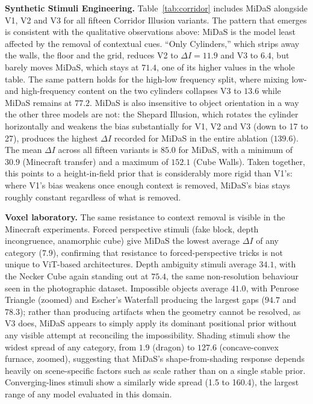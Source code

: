 \documentclass[10pt,twocolumn]{article}
\begin{document}
\textbf{Synthetic Stimuli Engineering.} Table~\ref{tab:corridor} includes MiDaS
alongside V1, V2 and V3 for all fifteen Corridor Illusion variants. The pattern
that emerges is consistent with the qualitative observations above: MiDaS is the
model least affected by the removal of contextual cues. ``Only Cylinders,'' which
strips away the walls, the floor and the grid, reduces V2 to $\Delta I = 11.9$ and
V3 to $6.4$, but barely moves MiDaS, which stays at $71.4$, one of its higher
values in the whole table. The same pattern holds for the high-low frequency
split, where mixing low- and high-frequency content on the two cylinders collapses
V3 to $13.6$ while MiDaS remains at $77.2$. MiDaS is also insensitive to object
orientation in a way the other three models are not: the Shepard Illusion, which
rotates the cylinder horizontally and weakens the bias substantially for V1, V2 and
V3 (down to 17 to 27), produces the highest $\Delta I$ recorded for MiDaS in the
entire ablation ($139.6$). The mean $\Delta I$ across all fifteen variants is
$85.0$ for MiDaS, with a minimum of $30.9$ (Minecraft transfer) and a maximum of
$152.1$ (Cube Walls). Taken together, this points to a height-in-field prior that
is considerably more rigid than V1's: where V1's bias weakens once enough context
is removed, MiDaS's bias stays roughly constant regardless of what is removed.

\textbf{Voxel laboratory.} The same resistance to context removal is visible in
the Minecraft experiments. Forced perspective stimuli (fake block, depth
incongruence, anamorphic cube) give MiDaS the lowest average $\Delta I$ of any
category ($7.9$), confirming that resistance to forced-perspective tricks is not
unique to ViT-based architectures. Depth ambiguity stimuli average $34.1$, with
the Necker Cube again standing out at $75.4$, the same non-resolution behaviour
seen in the photographic dataset. Impossible objects average $41.0$, with Penrose
Triangle (zoomed) and Escher's Waterfall producing the largest gaps ($94.7$ and
$78.3$); rather than producing artifacts when the geometry cannot be resolved, as
V3 does, MiDaS appears to simply apply its dominant positional prior without any
visible attempt at reconciling the impossibility. Shading stimuli show the widest
spread of any category, from $1.9$ (dragon) to $127.6$ (concave-convex furnace,
zoomed), suggesting that MiDaS's shape-from-shading response depends heavily on
scene-specific factors such as scale rather than on a single stable prior.
Converging-lines stimuli show a similarly wide spread (1.5 to 160.4), the largest
range of any model evaluated in this domain.
\end{document}
